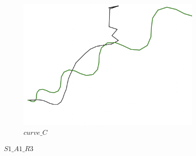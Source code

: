 \begin{figure}[H]
\begin{subfigure}[b]{0.31\textwidth}
         \includegraphics[width=\textwidth]{images/ddpg_results/simple_envs_S1_S2/S1_A1_R3_K3_curve_C.png}
         \caption{$curve\_C$}
     \end{subfigure}
        \caption{$S1\_A1\_R3$}
        \label{fig:simpleCurves2}
\end{figure}



